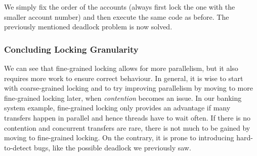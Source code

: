\documentclass[main.tex]{subfiles}
\begin{document}
\noindent We simply fix the order of the accounts (always first lock the one with the smaller account number) and then execute the same code as before. The previously mentioned deadlock problem is now solved.

\subsubsection{Concluding Locking Granularity}
We can see that fine-grained locking allows for more parallelism, but it also requires more work to ensure correct behaviour. In general, it is wise to start with coarse-grained locking and to try improving parallelism by moving to more fine-grained locking later, when \textit{contention} becomes an issue. In our banking system example, fine-grained locking only provides an advantage if many transfers happen in parallel and hence threads have to wait often. If there is no contention and concurrent transfers are rare, there is not much to be gained by moving to fine-grained locking. On the contrary, it is prone to introducing hard-to-detect bugs, like the possible deadlock we previously saw.
\end{document}
